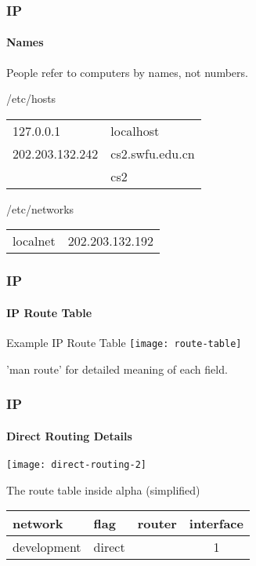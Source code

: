 \documentclass[hyperref={xetex,colorlinks,linkcolor=blue},green,compress]{beamer}
\begin{document}
  \begin{frame}
    \frametitle{IP} \framesubtitle{Names}
    People refer to computers by names, not numbers.
    \begin{exampleblock}{/etc/hosts}
      \begin{center}
        \begin{tabular}{ll}
          127.0.0.1 & localhost\\
          202.203.132.242 & cs2.swfu.edu.cn\\
          & cs2
        \end{tabular}
      \end{center}
    \end{exampleblock}

    \begin{exampleblock}{/etc/networks}
      \begin{center}
        \begin{tabular}{ll}
          localnet & 202.203.132.192\\
        \end{tabular}
      \end{center}
    \end{exampleblock}
  \end{frame}

  \begin{frame}
    \frametitle{IP} \framesubtitle{IP Route Table}
    \begin{exampleblock}{Example IP Route Table}
      \texttt{[image: route-table]}
    \end{exampleblock}
    'man route' for detailed meaning of each field.
  \end{frame}

  \begin{frame}
    \frametitle{IP} \framesubtitle{Direct Routing Details}
    \begin{center}
      \texttt{[image: direct-routing-2]}
    \end{center}

    \begin{exampleblock}{The route table inside alpha (simplified)}
      \begin{center}
        \begin{tabular}{|llcc|}
          \hline
          network & flag & router & interface\\\hline
          development & direct & & 1\\\hline
        \end{tabular}
      \end{center}
    \end{exampleblock}
  \end{frame}
\end{document}
